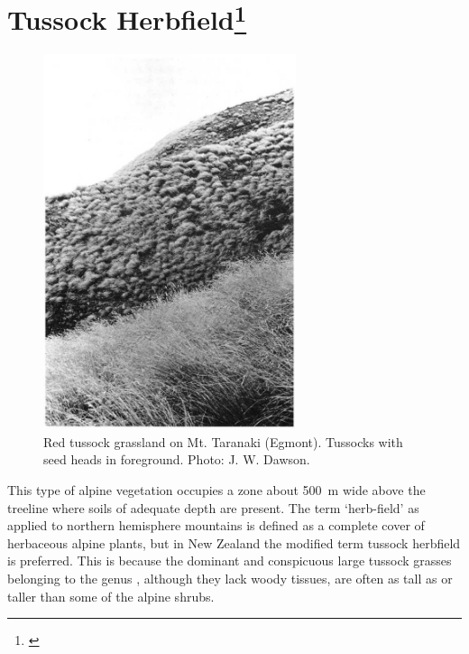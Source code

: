 \section[Tussock Herbfield]{Tussock Herbfield\thinspace\footnote{\cite{mark1980progress}}}

\begin{figure}
	\includegraphics[width=0.66\textwidth]{graphics/figure95red-tussock.jpg}
	\centering
	\caption[Red tussock grassland on Mt. Taranaki]{Red tussock grassland on Mt. Taranaki (Egmont).
	Tussocks with seed heads in foreground.
	Photo: J. W. Dawson.}%
	\label{fig:95red-tussock}
\end{figure}

This type of alpine vegetation occupies a zone about \SI{500}{\metre} wide above the treeline where soils of adequate depth are present.
The term `herb-field' as applied to northern hemisphere mountains is defined as a complete cover of herbaceous alpine plants, but in New Zealand the modified term tussock herbfield is preferred.
This is because the dominant and conspicuous large tussock grasses belonging to the genus , although they lack woody tissues, are often as tall as or taller than some of the alpine shrubs.

